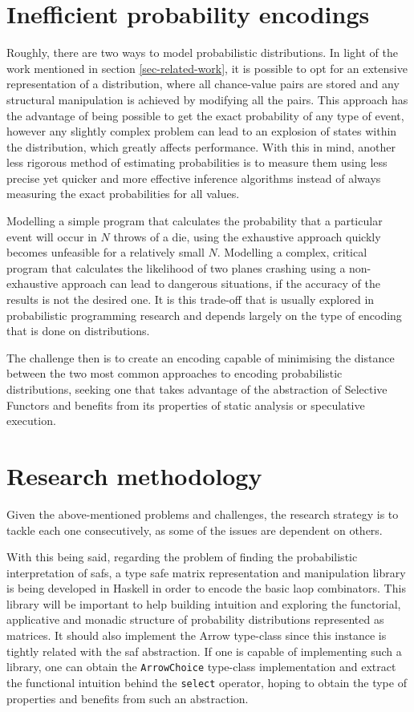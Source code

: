 \documentclass[
  oneside,
  11pt, a4paper,
  footinclude=true,
  headinclude=true,
  cleardoublepage=empty
]{scrbook}
\theoremstyle{definition}
\theoremstyle{definition}
\begin{document}
	\section{Inefficient probability encodings}
	
	Roughly, there are two ways to model probabilistic distributions. In light of the work mentioned in section \ref{sec-related-work}, it is possible to opt for an extensive representation of a distribution, where all chance-value pairs are stored and any structural manipulation is achieved by modifying all the pairs. This approach has the advantage of being possible to get the exact probability of any type of event, however any slightly complex problem can lead to an explosion of states within the distribution, which greatly affects performance. With this in mind, another less rigorous method of estimating probabilities is to measure them using less precise yet quicker and more effective inference algorithms instead of always measuring the exact probabilities for all values. 
	
    Modelling a simple program that calculates the probability that a particular event will occur in $N$ throws of a die, using the exhaustive approach quickly becomes unfeasible for a relatively small $N$. Modelling a complex, critical program that calculates the likelihood of two planes crashing using a non-exhaustive approach can lead to dangerous situations, if the accuracy of the results is not the desired one. It is this trade-off that is usually explored in probabilistic programming research and depends largely on the type of encoding that is done on distributions.

    The challenge then is to create an encoding capable of minimising the distance between the two most common approaches to encoding probabilistic distributions, seeking one that takes advantage of the abstraction of Selective Functors and benefits from its properties of static analysis or speculative execution.
	
	\section{Research methodology}\label{sec-approach}
	
	Given the above-mentioned problems and challenges, the research strategy is to tackle each one consecutively, as some of the issues are dependent on others.
	
	With this being said, regarding the problem of finding the probabilistic interpretation of \glspl{saf}, a type safe matrix representation and manipulation library is being developed in Haskell in order to encode the basic \gls{laop} combinators. This library will be important to help building intuition and exploring the functorial, applicative and monadic structure of probability distributions represented as matrices. It should also implement the Arrow type-class since this instance is tightly related with the \gls{saf} abstraction. If one is capable of implementing such a library, one can obtain the \texttt{ArrowChoice} type-class implementation and extract the functional intuition behind the \texttt{select} operator, hoping to obtain the type of properties and benefits from such an abstraction. 
	
\end{document}
